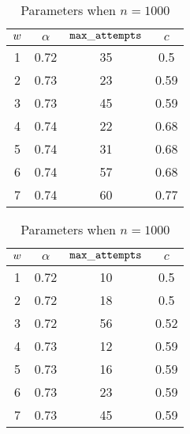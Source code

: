 \begin{table}
\parbox{.45\linewidth}{
	\centering
	\begin{tabular}{|c|c|c|c|}
		\hline
		$ w $ & $ \alpha $ & $ \mathtt{max\_attempts} $& $ c $  \\\hline
1&0.72&35&0.5
\\\hline
2&0.73&23&0.59
\\\hline
3&0.73&45&0.59
\\\hline
4&0.74&22&0.68
\\\hline
5&0.74&31&0.68
\\\hline
6&0.74&57&0.68
\\\hline
7&0.74&60&0.77
\\\hline
	\end{tabular}
\caption{Parameters when $ n = 500 $}
\label{tb:param500}
}
\hfill
\parbox{.45\linewidth}{
	\centering
	\begin{tabular}{|c|c|c|c|}
		\hline
		$ w $ & $ \alpha $ & $ \mathtt{max\_attempts} $& $ c $  \\\hline
	1&0.72&10&0.5
	\\\hline
	2&0.72&18&0.5
	\\\hline
	3&0.72&56&0.52
	\\\hline
	4&0.73&12&0.59
	\\\hline
	5&0.73&16&0.59
	\\\hline
	6&0.73&23&0.59
	\\\hline
	7&0.73&45&0.59
	\\\hline
	\end{tabular}
	\caption{Parameters when $ n = 1000 $}
	\label{tb:param1000}
}
\end{table}





 
 
 
 